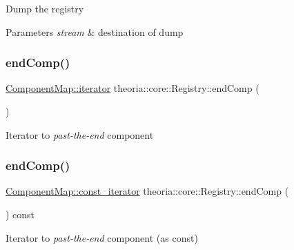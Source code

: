 Dump the registry 
\begin{DoxyParams}{Parameters}
{\em stream} & destination of dump \\
\hline
\end{DoxyParams}
\mbox{\label{classtheoria_1_1core_1_1Registry_a66ed200d29e49b9eb762a29f580c102a}} 
\subsubsection{\texorpdfstring{end\+Comp()}{endComp()}\hspace{0.1cm}{\footnotesize\ttfamily [1/2]}}
{\footnotesize\ttfamily \hyperlink{classtheoria_1_1util_1_1densemap_a4ee170442110252d3033534246f9677f}{Component\+Map\+::iterator} theoria\+::core\+::\+Registry\+::end\+Comp (\begin{DoxyParamCaption}{ }\end{DoxyParamCaption})}

Iterator to {\itshape past-\/the-\/end} component \mbox{\label{classtheoria_1_1core_1_1Registry_a27b24a7a567677cb23aef0d3510b0a20}} 
\subsubsection{\texorpdfstring{end\+Comp()}{endComp()}\hspace{0.1cm}{\footnotesize\ttfamily [2/2]}}
{\footnotesize\ttfamily \hyperlink{classtheoria_1_1util_1_1densemap_a8c2937f8e4ba47abf344d9f9f23f0c88}{Component\+Map\+::const\+\_\+iterator} theoria\+::core\+::\+Registry\+::end\+Comp (\begin{DoxyParamCaption}{ }\end{DoxyParamCaption}) const}

Iterator to {\itshape past-\/the-\/end} component (as const) \mbox{\label{classtheoria_1_1core_1_1Registry_ac88948c696663ae6f7ba3ece5c2fdcc9}} 

